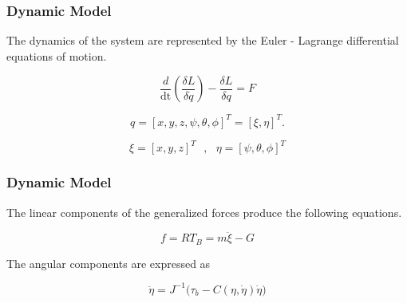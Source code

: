 \documentclass{beamer}
\begin{document}

\begin{frame}
\frametitle{Dynamic Model}

\noindent The dynamics of the system are represented by the Euler - Lagrange differential equations of motion.

\begin{equation}
    \frac{d}{\text{dt}} \left( \frac{\delta  L} {\delta \dot{q}}\right) - \frac{\delta  L}{\delta q}=F
\end{equation}

\begin{equation}
 q = [x,y,z,\psi ,\theta ,\phi ]^T = [ \xi , \eta ]^T  .
\end{equation}

\begin{equation}
  \xi  = [x,y,z]^T  \text{ } , \text{ }
  \eta = [\psi ,\theta ,\phi]^T
\end{equation}

\end{frame}




\begin{frame}
\frametitle{Dynamic Model}

\noindent The linear components of the generalized forces produce the following equations.

\begin{equation}
    \label{linforce}
    f =  R  T_B = m \ddot{ \xi} -  G
\end{equation}


\noindent The angular components are expressed as

\begin{equation}
    \label{eq:angularacc}
    \ddot{\eta} = J^{-1} \big( \tau_b - C(\eta,\dot{\eta}) \dot{\eta} \big)
\end{equation}



\end{frame}



\end{document}
